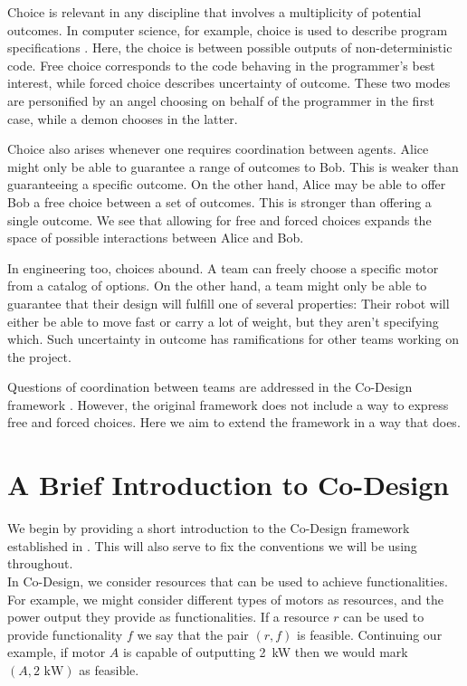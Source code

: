\documentclass[12pt]{article}
\theoremstyle{definition}
\theoremstyle{plain}
\theoremstyle{plain}
\theoremstyle{plain}
\theoremstyle{plain}
\theoremstyle{remark}
\theoremstyle{remark}
\begin{document}
Choice is relevant in any discipline that involves a multiplicity of potential outcomes. In computer science, for example, choice is used to describe program specifications \cite{Martin2007,Morris2004}. Here, the choice is between possible outputs of non-deterministic code. Free choice corresponds to the code behaving in the programmer's best interest, while forced choice describes uncertainty of outcome. These two modes are personified by an angel choosing on behalf of the programmer in the first case, while a demon chooses in the latter.

Choice also arises whenever one requires coordination between agents. Alice might only be able to guarantee a range of outcomes to Bob. This is weaker than guaranteeing a specific outcome. On the other hand, Alice may be able to offer Bob a free choice between a set of outcomes. This is stronger than offering a single outcome. We see that allowing for free and forced choices expands the space of possible interactions between Alice and Bob.

In engineering too, choices abound. A team can freely choose a specific motor from a catalog of options. On the other hand, a team might only be able to guarantee that their design will fulfill one of several properties: Their robot will either be able to move fast or carry a lot of weight, but they aren't specifying which. Such uncertainty in outcome has ramifications for other teams working on the project. 

Questions of coordination between teams are addressed in the Co-Design framework \cite{Censi2015}. However, the original framework does not include a way to express free and forced choices. Here we aim to extend the framework in a way that does. 

\section{A Brief Introduction to Co-Design}
We begin by providing a short introduction to the Co-Design framework established in \cite{Censi2015}. This will also serve to fix the conventions we will be using throughout. \\

In Co-Design, we consider resources that can be used to achieve functionalities. For example, we might consider different types of motors as resources, and the power output they provide as functionalities. If a resource $r$ can be used to provide functionality $f$ we say that the pair $(r,f)$ is feasible. Continuing our example, if motor $A$ is capable of outputting \mbox{2 kW} then we would mark $(A,\text{2 kW})$ as feasible.
\end{document}

